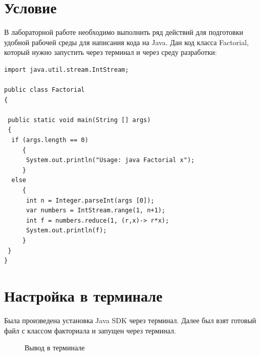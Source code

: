 \documentclass[a4paper, 14pt]{extarticle}
\begin{document}
\newpage
\section{Условие}
В лабораторной работе необходимо выполнить ряд действий для подготовки удобной рабочей среды для написания кода на Java. Дан код класса Factorial, который нужно запустить через терминал и через среду разработки:
\begin{verbatim}
import java.util.stream.IntStream;

public class Factorial 
{ 

 public static void main(String [] args) 
 { 
  if (args.length == 0) 
     { 
      System.out.println("Usage: java Factorial x"); 
     } 
  else 
     { 
      int n = Integer.parseInt(args [0]);
      var numbers = IntStream.range(1, n+1); 
      int f = numbers.reduce(1, (r,x)-> r*x); 
      System.out.println(f); 
     } 
 } 
} 
\end{verbatim}

\section{Настройка в терминале}
Была произведена установка Java SDK через терминал. Далее был взят готовый файл с классом факториала и запущен через терминал.
\begin{figure}[h] 
\caption{Вывод в терминале} 
\label{fig:image} 
\end{figure}
\end{document}
